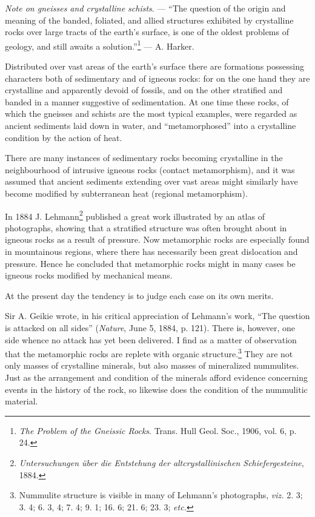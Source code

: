 \documentclass[a4paper, 12pt, oneside]{article}
\begin{document}
\emph{Note on gneisses and crystalline schists}. --- ``The question of the origin and meaning of the banded, foliated, and allied structures exhibited by crystalline rocks over large tracts of the earth's surface, is one of the oldest problems of geology, and still awaits a solution.''\footnote{\emph{The Problem of the Gneissic Rocks}. Trans. Hull Geol. Soc., 1906, vol. 6, p. 24.} --- A. Harker.

Distributed over vast areas of the earth's surface there are formations possessing characters both of sedimentary and of igneous rocks: for on the one hand they are crystalline and apparently devoid of fossils, and on the other stratified and banded in a manner suggestive of sedimentation. At one time these rocks, of which the gneisses and schists are the most typical examples, were regarded as ancient sediments laid down in water, and ``metamorphosed'' into a crystalline condition by the action of heat.

There are many instances of sedimentary rocks becoming crystalline in the neighbourhood of intrusive igneous rocks (contact metamorphism), and it was assumed that ancient sediments extending over vast areas might similarly have become modified by subterranean heat (regional metamorphism).

In 1884 J. Lehmann\footnote{\emph{Untersuchungen über die Entstehung der altcrystallinischen Schiefergesteine}, 1884.} published a great work illustrated by an atlas of photographs, showing that a stratified structure was often brought about in igneous rocks as a result of pressure. Now metamorphic rocks are especially found in mountainous regions, where there has necessarily been great dislocation and pressure. Hence he concluded that metamorphic rocks might in many cases be igneous rocks modified by mechanical means.

At the present day the tendency is to judge each case on its own merits.

Sir A. Geikie wrote, in his critical appreciation of Lehmann's work, ``The question is attacked on all sides'' (\emph{Nature}, June 5, 1884, p. 121). There is, however, one side whence no attack has yet been delivered. I find as a matter of observation that the metamorphic rocks are replete with organic structure.\footnote{Nummulite structure is visible in many of Lehmann's photographs, \emph{viz.} 2. 3; 3. 4; 6. 3, 4; 7. 4; 9. 1; 16. 6; 21. 6; 23. 3; \emph{etc.}} They are not only masses of crystalline minerals, but also masses of mineralized nummulites. Just as the arrangement and condition of the minerals afford evidence concerning events in the history of the rock, so likewise does the condition of the nummulitic material.
\end{document}
